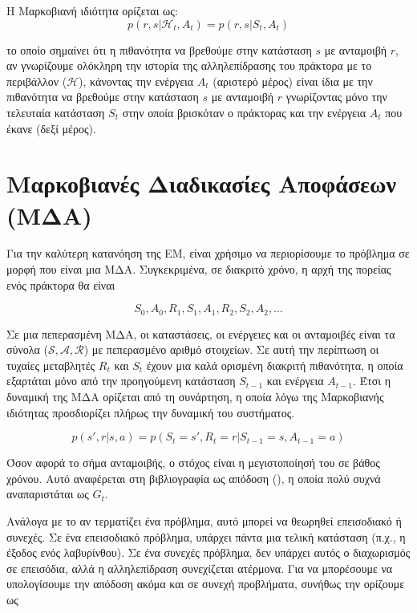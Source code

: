 Η Μαρκοβιανή ιδιότητα ορίζεται ως:
\begin{equation}
    p(r,s | \mathcal{H}_t, A_t) = p(r,s|S_t, A_t)
\end{equation}

το οποίο σημαίνει ότι η πιθανότητα να βρεθούμε στην κατάσταση $s$ με ανταμοιβή $r$, αν γνωρίζουμε
ολόκληρη την ιστορία της αλληλεπίδρασης του πράκτορα με το περιβάλλον ($\mathcal{H}$), κάνοντας
την ενέργεια $A_t$ (αριστερό μέρος) είναι ίδια με την πιθανότητα να βρεθούμε στην κατάσταση $s$ με
ανταμοιβή $r$ γνωρίζοντας μόνο την τελευταία κατάσταση $S_t$ στην οποία βρισκόταν ο πράκτορας
και την ενέργεια $A_t$ που έκανε (δεξί μέρος).

\section{Μαρκοβιανές Διαδικασίες Αποφάσεων (ΜΔΑ)}

Για την καλύτερη κατανόηση της ΕΜ, είναι χρήσιμο να περιορίσουμε το πρόβλημα σε μορφή που είναι μια ΜΔΑ.
Συγκεκριμένα, σε διακριτό χρόνο, η αρχή της πορείας ενός πράκτορα θα είναι

\begin{equation*}
    S_0, A_0, R_1, S_1, A_1, R_2, S_2, A_2,\ldots
\end{equation*}

Σε μια πεπερασμένη ΜΔΑ, οι καταστάσεις, οι ενέργειες και οι ανταμοιβές είναι τα σύνολα
($\mathcal{S}, \mathcal{A}, \mathcal{R}$) με πεπερασμένο αριθμό στοιχείων.
Σε αυτή την περίπτωση οι τυχαίες μεταβλητές $R_t$ και $S_t$ έχουν μια καλά ορισμένη διακριτή πιθανότητα,
η οποία εξαρτάται μόνο από την προηγούμενη κατάσταση $S_{t-1}$ και ενέργεια $A_{t-1}$.
Έτσι η δυναμική της ΜΔΑ ορίζεται από τη συνάρτηση, η οποία λόγω της Μαρκοβιανής ιδιότητας προσδιορίζει πλήρως την δυναμική του συστήματος.


\begin{equation}
    p(s', r | s, a) = p(S_t = s', R_t = r | S_{t-1} = s, A_{t-1} = a)
\end{equation}

Όσον αφορά το σήμα ανταμοιβής, ο στόχος είναι η μεγιστοποίησή του σε βάθος χρόνου.
Αυτό αναφέρεται στη βιβλιογραφία ως απόδοση (), η οποία πολύ συχνά αναπαριστάται ως $G_t$.

Ανάλογα με το αν τερματίζει ένα πρόβλημα, αυτό μπορεί να θεωρηθεί επεισοδιακό ή συνεχές. Σε ένα επεισοδιακό πρόβλημα,
υπάρχει πάντα μια τελική κατάσταση (π.χ., η έξοδος ενός λαβυρίνθου).
Σε ένα συνεχές πρόβλημα, δεν υπάρχει αυτός ο διαχωρισμός σε επεισόδια, αλλά η αλληλεπίδραση συνεχίζεται ατέρμονα.
Για να μπορέσουμε να υπολογίσουμε την απόδοση ακόμα και σε συνεχή προβλήματα, συνήθως την ορίζουμε ως

